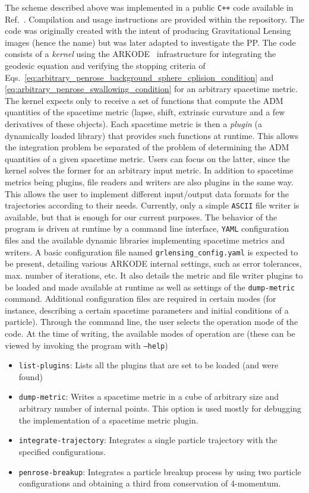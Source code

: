 The scheme described above was implemented in a public \texttt{C++} code available in Ref.~\cite{GRLensingRepo}. Compilation and usage instructions are provided within the repository. The code was originally created with the intent of producing Gravitational Lensing images (hence the name) but was later adapted to investigate the PP. The code consists of a \emph{kernel} using the ARKODE~\cite{ARKODE} infrastructure for integrating the geodesic equation and verifying the stopping criteria of Eqs.~\eqref{eq:arbitrary_penrose_background_sphere_cplision_condition} and \eqref{eq:arbitrary_penrose_swallowing_condition} for an arbitrary spacetime metric. The kernel expects only to receive a set of functions that compute the ADM quantities of the spacetime metric (lapse, shift, extrinsic curvature and a few derivatives of these objects). Each spacetime metric is then a \emph{plugin} (a dynamically loaded library) that provides such functions at runtime. This allows the integration problem be separated of the problem of determining the ADM quantities of a given spacetime metric. Users can focus on the latter, since the kernel solves the former for an arbitrary input metric. In addition to spacetime metrics being plugins, file readers and writers are also plugins in the same way. This allows the user to implement different input/output data formats for the trajectories according to their needs. Currently, only a simple \texttt{ASCII} file writer is available, but that is enough for our current purposes. The behavior of the program is driven at runtime by a command line interface, \texttt{YAML} configuration files and the available dynamic libraries implementing spacetime metrics and writers. A basic configuration file named \texttt{grlensing\_config.yaml} is expected to be present, detailing various ARKODE internal settings, such as error tolerances, max. number of iterations, etc. It also details the metric and file writer plugins to be loaded and made available at runtime as well as settings of the \texttt{dump-metric} command. Additional configuration files are required in certain modes (for instance, describing a certain spacetime parameters and initial conditions of a particle). Through the command line, the user selects the operation mode of the code. At the time of writing, the available modes of operation are (these can be viewed by invoking the program with \texttt{--help})
%
\begin{itemize}
  \item \texttt{list-plugins}: Lists all the plugins that are set to be loaded (and were found)
  \item \texttt{dump-metric}: Writes a spacetime metric in a cube of arbitrary size and arbitrary number of internal points. This option is used mostly for debugging the implementation of a spacetime metric plugin.
  \item \texttt{integrate-trajectory}: Integrates a single particle trajectory with the specified configurations.
  \item \texttt{penrose-breakup}: Integrates a particle breakup process by using two particle configurations and obtaining a third from conservation of 4-momentum.
\end{itemize}
